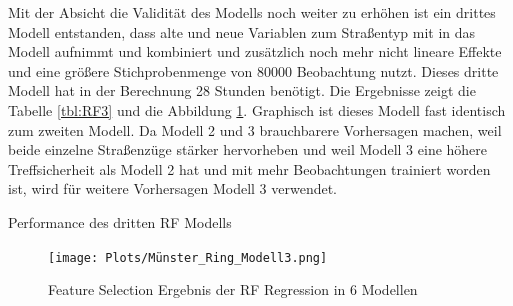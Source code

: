 \documentclass[a4paper,12pt]{thesis}
\begin{document}
Mit der Absicht die Validität des Modells noch weiter zu erhöhen ist ein drittes Modell entstanden, dass alte und neue Variablen zum  Straßentyp mit in das Modell aufnimmt und kombiniert und zusätzlich noch mehr nicht lineare Effekte und eine größere Stichprobenmenge von 80000 Beobachtung nutzt. Dieses dritte Modell hat in der Berechnung 28 Stunden benötigt. Die Ergebnisse zeigt die Tabelle \ref{tbl:RF3} und die Abbildung \ref{Munster}. Graphisch ist dieses Modell fast identisch zum zweiten Modell. Da Modell 2 und 3 brauchbarere Vorhersagen machen, weil beide einzelne Straßenzüge stärker hervorheben und weil Modell 3 eine höhere Treffsicherheit als Modell 2 hat und mit mehr Beobachtungen trainiert worden ist, wird für weitere Vorhersagen Modell 3 verwendet.

\begin{table}
	\caption{Performance des dritten RF Modells}
	\label{tbl:RF3}
\end{table}

\begin{figure}[!ht]
	\centering
	\texttt{[image: Plots/Münster\_Ring\_Modell3.png]}
	\caption{Feature Selection Ergebnis der RF Regression in 6 Modellen}
	\label{Munster}
\end{figure}
\end{document}
